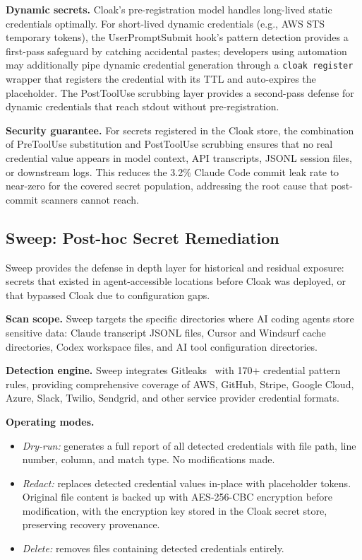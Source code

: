 \documentclass[11pt,letterpaper]{article}
\begin{document}
\textbf{Dynamic secrets.} Cloak's pre-registration model handles long-lived static
credentials optimally. For short-lived dynamic credentials (e.g., AWS STS temporary tokens),
the UserPromptSubmit hook's pattern detection provides a first-pass safeguard by catching
accidental pastes; developers using automation may additionally pipe dynamic credential
generation through a \texttt{cloak register} wrapper that registers the credential with
its TTL and auto-expires the placeholder. The PostToolUse scrubbing layer provides a
second-pass defense for dynamic credentials that reach stdout without pre-registration.

\textbf{Security guarantee.} For secrets registered in the Cloak store, the combination
of PreToolUse substitution and PostToolUse scrubbing ensures that no real credential value
appears in model context, API transcripts, JSONL session files, or downstream logs. This
reduces the 3.2\% Claude Code commit leak rate to near-zero for the covered secret
population, addressing the root cause that post-commit scanners cannot reach.

\subsection{Sweep: Post-hoc Secret Remediation}

Sweep provides the defense in depth layer for historical and residual exposure: secrets
that existed in agent-accessible locations before Cloak was deployed, or that bypassed
Cloak due to configuration gaps.

\textbf{Scan scope.} Sweep targets the specific directories where AI coding agents
store sensitive data: Claude transcript JSONL files, Cursor and Windsurf cache
directories, Codex workspace files, and AI tool configuration directories.

\textbf{Detection engine.} Sweep integrates Gitleaks~\citep{rice2024gitleaks} with
170+ credential pattern rules, providing comprehensive coverage of AWS, GitHub, Stripe,
Google Cloud, Azure, Slack, Twilio, Sendgrid, and other service provider credential
formats.

\textbf{Operating modes.}
\begin{itemize}[noitemsep,topsep=2pt]
  \item \emph{Dry-run:} generates a full report of all detected credentials with file
        path, line number, column, and match type. No modifications made.
  \item \emph{Redact:} replaces detected credential values in-place with placeholder
        tokens. Original file content is backed up with AES-256-CBC encryption before
        modification, with the encryption key stored in the Cloak secret store, preserving
        recovery provenance.
  \item \emph{Delete:} removes files containing detected credentials entirely.
\end{itemize}
\end{document}
